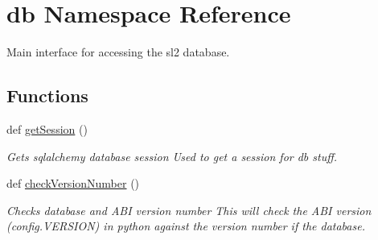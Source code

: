 \hypertarget{namespacedb}{}\section{db Namespace Reference}
\label{namespacedb}


Main interface for accessing the sl2 database.  


\subsection*{Functions}
\begin{DoxyCompactItemize}
\item 
def \mbox{\hyperlink{namespacedb_a530aed4ecf4b7ab965ac1d3a432f1e68}{get\+Session}} ()
\begin{DoxyCompactList}\small\item\em Gets sqlalchemy database session Used to get a session for db stuff. \end{DoxyCompactList}\item 
def \mbox{\hyperlink{namespacedb_a2c7a16a011e2939fe901022bcc78574d}{check\+Version\+Number}} ()
\begin{DoxyCompactList}\small\item\em Checks database and A\+BI version number This will check the A\+BI version (config.\+V\+E\+R\+S\+I\+ON) in python against the version number if the database. \end{DoxyCompactList}\end{DoxyCompactItemize}
